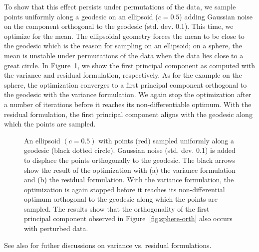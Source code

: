 \documentclass[final]{svjour3}
\begin{document}
To show that this effect persists under permutations of the data,
we sample points uniformly along a geodesic on an ellipsoid ($c=0.5$)
adding Gaussian noise on the component orthogonal to the geodesic (std. dev.
$0.1$). This time, we optimize for the mean. The ellipsoidal geometry forces the mean
to be close to the geodesic which is the reason for sampling on an ellipsoid; on a
sphere, the mean is unstable under permutations of the data when the data lies
close to a great circle. In
Figure~\ref{fig:ellipsoid-orth}, we show the first principal component as
computed with the variance and residual formulation, respectively.
As for the example on the sphere, the optimization
converges to a first principal component orthogonal to the geodesic with the
variance formulation. We again stop the optimization after a number of iterations
before it reaches its non-differentiable optimum.
With the residual formulation, the first principal
component aligns with the geodesic along which the points are sampled.
\begin{figure}[h]
    \begin{center}
    \end{center}
    \caption{An ellipsoid $(c=0.5)$ with points (red) sampled uniformly along a geodesic
    (black dotted circle). Gaussian noise
    (std. dev. 0.1) is added to displace the points orthogonally to the
    geodesic.
    The black arrows show
    the result of the optimization with (a) the variance formulation and (b) the
    residual formulation. 
    With the variance formulation, the optimization is again
    stopped before it reaches its non-differential optimum orthogonal to
    the geodesic along which the points are sampled.
    The results show that the orthogonality of the first principal component
    observed in Figure~\ref{fig:sphere-orth} also occurs with perturbed data.}
    \label{fig:ellipsoid-orth}
\end{figure}
See also \cite{huckemann_intrinsic_2010} for futher
discussions on variance vs. residual formulations.
\end{document}

